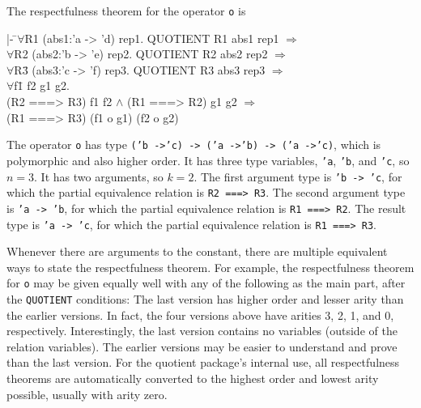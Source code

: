 \documentclass[envcountsame,runningheads]{llncs}
\newcommand{\quotient}{partial equivalence}
\begin{document}
The respectfulness theorem for the operator {\tt o} is
{\tt \begin{tabbing}
\hspace{5.5mm}
    |- \=$\forall$R1 (abs1:'a -> 'd) rep1. QUOTIENT R1 abs1 rep1 $\Rightarrow$ \\
\>     $\forall$R2 (abs2:'b -> 'e) rep2. QUOTIENT R2 abs2 rep2 $\Rightarrow$ \\
\>     $\forall$R\=3 (abs3:'c -> 'f) rep3. QUOTIENT R3 abs3 rep3 $\Rightarrow$ \\
\>\>     $\forall$f\=1 f2 g1 g2. \\
\>\>\>     (R2 ===> R3) f1 f2 $\wedge$ (R1 ===> R2) g1 g2 $\Rightarrow$ \\
\>\>\>     (R1 ===> R3) (f1 o g1) (f2 o g2)
\end{tabbing}}
The operator {\tt o} has type
{\tt ('b ->\;'c) -> ('a ->\;'b) -> ('a ->\;'c)},
which is polymorphic and also higher order.
It has three type variables, {\tt 'a}, {\tt 'b}, and {\tt 'c}, so $n = 3$. 
It has two arguments, so $k = 2$.
The first argument type is
{\tt 'b -> 'c},
for which
the \quotient{} relation
is {\tt R2 ===> R3}.
The second argument type is
{\tt 'a -> 'b},
for which
the \quotient{} relation
is {\tt R1 ===> R2}.
The result type is
{\tt 'a -> 'c},
for which
the \quotient{} relation
is {\tt R1 ===> R3}.

Whenever there are arguments to the constant, there are
multiple equivalent ways to state the respectfulness theorem.
For example, the respectfulness theorem for {\tt o} may be given
equally well with any of the following as the main part, after the
{\tt QUOTIENT} conditions:
The last version has higher order and lesser arity than the
earlier versions.  In fact, the four versions above have arities
3, 2, 1, and 0, respectively.
Interestingly, the last version contains no variables (outside of the 
relation variables).
The earlier versions may be easier to understand and prove than the
last version.  For the quotient package's internal use, all respectfulness
theorems are automatically converted to the highest order and lowest
arity possible, usually with arity zero.
\end{document}
